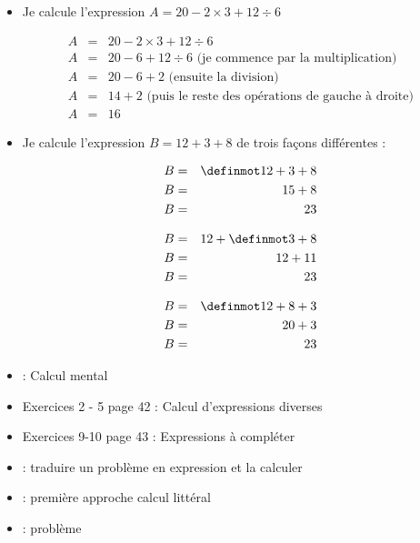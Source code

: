 \documentclass[12pt,a4paper]{article}
\begin{document}
\begin{myexs}
	\begin{itemize}
		\item Je calcule l'expression $A= 20 - 2 \times 3 + 12 \div 6$
		
		\vspace*{-0.5cm}
		
		\begin{eqnarray*}
		 A &=& 20 - 2 \times 3 + 12 \div 6 \\
		 A &=& 20 - 6 + 12 \div 6 \text{ (je commence par la multiplication) }\\
		 A &=& 20 - 6 + 2 \text{ (ensuite la division)} \\
		 A &=& 14 + 2 \text{ (puis le reste des opérations de gauche à droite)}\\
		 A &=& 16
		\end{eqnarray*}
	
		\item Je calcule l'expression $B= 12 + 3 +8$ de trois façons différentes :
		
		\vspace*{-0.5cm}
		\begin{multicols}{3}
			\begin{eqnarray*}
				B &=& \kw{12 + 3} + 8 \\
				B &=& 15 + 8 \\
				B &=& 23
			\end{eqnarray*}
		
			\begin{eqnarray*}
				B &=& 12 + \kw{3 + 8} \\
				B &=& 12 + 11 \\
				B &=& 23
			\end{eqnarray*}
		
			\begin{eqnarray*}
				B &=& \kw{12 + 8} + 3 \\
				B &=& 20 + 3 \\
				B &=& 23
			\end{eqnarray*}
		\end{multicols}
	
	\end{itemize}
\end{myexs}

\begin{myexos}
	\begin{itemize}
		\item {} : Calcul mental
		\item Exercices 2 - 5 page 42 : Calcul d'expressions diverses
		\item Exercices 9-10 page 43 : Expressions à compléter
		\item {} : traduire un problème en expression et la calculer
		\item {} : première approche calcul littéral
		\item {} : problème
	\end{itemize}
\end{myexos}
\end{document}
